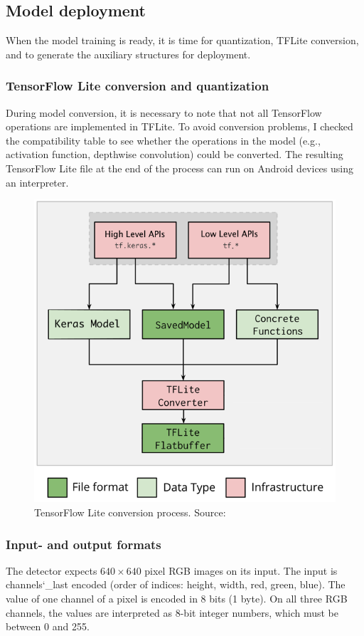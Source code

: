 \subsection{Model deployment}

When the model training is ready, it is time for quantization, TFLite conversion, and to generate the auxiliary structures for deployment.

\subsubsection{TensorFlow Lite conversion and quantization}

During model conversion, it is necessary to note that not all TensorFlow operations are implemented in TFLite. To avoid conversion problems, I checked the compatibility table to see whether the operations in the model (e.g., activation function, depthwise convolution) could be converted. The resulting TensorFlow Lite file at the end of the process can run on Android devices using an interpreter.

\begin{figure}[H]
 \centerline{\includegraphics[width=0.5\columnwidth]{.//Figure/PlateLocalization/tflite_converter.png}}
 \caption{TensorFlow Lite conversion process. Source: \cite{TensorFlowLiteConverter}}
 \label{fig:tflite_converter}
\end{figure}

\subsubsection{Input- and output formats}

The detector expects $640\times640$ pixel RGB images on its input. The input is channels\char`_last encoded (order of indices: height, width, red, green, blue). The value of one channel of a pixel is encoded in 8 bits (1 byte). On all three RGB channels, the values are interpreted as 8-bit integer numbers, which must be between 0 and 255.

